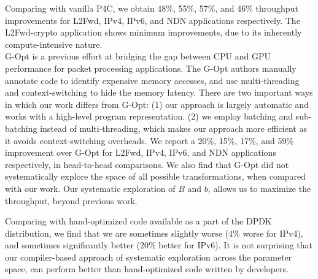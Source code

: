 Comparing with vanilla P4C, we obtain 48\%, 55\%, 57\%, and 46\% throughput improvements for L2Fwd, IPv4, IPv6, and NDN applications respectively.
The L2Fwd-crypto application shows minimum improvements, due to its inherently compute-intensive nature.
\\
G-Opt is a previous effort at bridging the gap between CPU and GPU performance for packet processing
applications. The G-Opt authors manually annotate code to identify expensive memory accesses, and use
multi-threading and context-switching to hide the memory latency. There are two important ways in which
our work differs from G-Opt: (1) our approach is largely automatic and works with a high-level
program representation. (2) we employ batching and sub-batching instead of multi-threading, which
makes our approach more efficient as it avoids context-switching overheads.
We report a 20\%, 15\%, 17\%, and 59\% improvement over G-Opt for L2Fwd, IPv4, IPv6, and NDN applications respectively,
in head-to-head comparisons. We also find that G-Opt did not systematically explore the space of
all possible transformations, when compared with our work. Our systematic exploration of $B$ and $b$, allows
us to maximize the throughput, beyond previous work.

Comparing with hand-optimized code available as a part of the DPDK distribution, we find that we are sometimes
slightly worse (4\% worse for IPv4), and sometimes significantly better (20\% better for IPv6). It is not
surprising that our compiler-based approach of systematic exploration across the parameter space, can perform
better than hand-optimized code written by developers.

